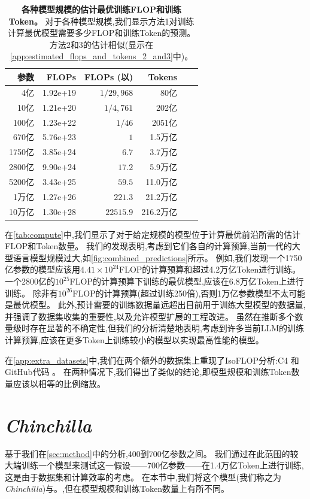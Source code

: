 \documentclass[11pt, a4paper, logo, copyright, nonumbering]{deepmind}
\newcommand{\gopher}{\textit{Gopher}\xspace}
\newcommand{\chinchilla}{\textit{Chinchilla}\xspace}
\begin{document}
\begin{table}[t]
    \caption{\textbf{各种模型规模的估计最优训练FLOP和训练Token。}
    对于各种模型规模,我们显示方法1对训练计算最优模型需要多少FLOP和训练Token的预测。方法2和3的估计相似(显示在\autoref{app:estimated_flops_and_tokens_2_and3}中)。}
    \label{tab:compute}
    \centering
    \begin{tabular}{r rrr rr}
    \toprule
    参数 & FLOPs & 
    FLOPs (以) & 
    Tokens \\
    \midrule
4亿 & 1.92e+19 & $1/29,968$ & 80亿 \\
10亿 & 1.21e+20 & $1/4,761$ & 202亿 \\
100亿 & 1.23e+22 & $1/46$ & 2051亿 \\
670亿 & 5.76e+23 & $1$ & 1.5万亿 \\
1750亿 & 3.85e+24 & $6.7$ & 3.7万亿 \\
2800亿 & 9.90e+24 & $17.2$ & 5.9万亿 \\
5200亿 & 3.43e+25 & $59.5$ & 11.0万亿 \\
1万亿 & 1.27e+26 & $221.3$ & 21.2万亿 \\
10万亿 & 1.30e+28 & $22515.9$ & 216.2万亿 \\
    \bottomrule
    \end{tabular}
\end{table}

在\autoref{tab:compute}中,我们显示了对于给定规模的模型位于计算最优前沿所需的估计FLOP和Token数量。
我们的发现表明,考虑到它们各自的计算预算,当前一代的大型语言模型规模过大,如\autoref{fig:combined_predictions}所示。
例如,我们发现一个1750亿参数的模型应该用$4.41\times 10^{24}$FLOP的计算预算和超过4.2万亿Token进行训练。一个2800亿的$10^{25}$FLOP的计算预算下训练的最优模型,应该在6.8万亿Token上进行训练。
除非有$10^{26}$FLOP的计算预算(超过训练250倍),否则1万亿参数模型不太可能是最优模型。
此外,预计需要的训练数据量远超出目前用于训练大型模型的数据量,并强调了数据集收集的重要性,以及允许模型扩展的工程改进。
虽然在推断多个数量级时存在显著的不确定性,但我们的分析清楚地表明,考虑到许多当前LLM的训练计算预算,应该在更多Token上训练较小的模型以实现最高性能的模型。

在\autoref{app:extra_datasets}中,我们在两个额外的数据集上重现了IsoFLOP分析:C4 \citep{raffel2019exploring}和GitHub代码 \citep{rae2021gopher}。
在两种情况下,我们得出了类似的结论,即模型规模和训练Token数量应该以相等的比例缩放。

\section{\chinchilla}
基于我们在\autoref{sec:method}中的分析,400到700亿参数之间。
我们通过在此范围的较大端训练一个模型来测试这一假设——700亿参数——在1.4万亿Token上进行训练,这是由于数据集和计算效率的考虑。
在本节中,我们将这个模型(我们称之为\chinchilla)与。,但在模型规模和训练Token数量上有所不同。
\end{document}

